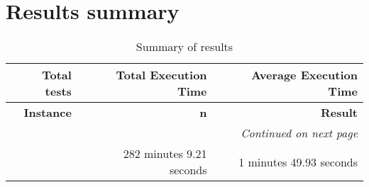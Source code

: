 \section{Results summary}
 \begin{longtable}{rrr} \caption{Summary of results}\label{table:results_summary}\\ \toprule \textbf{Total tests}& \textbf{Total Execution Time}& \textbf{Average Execution Time}\\
\midrule
\endfirsthead
\toprule
\textbf{Instance} & \textbf{n} & \textbf{Result} \\
\midrule
\endhead
\midrule
\multicolumn{3}{r}{\textit{Continued on next page}} \\
\midrule
\endfoot
\bottomrule
\endlastfoot
154 & 282 minutes 9.21 seconds & 1 minutes 49.93 seconds \\
\end{longtable}


